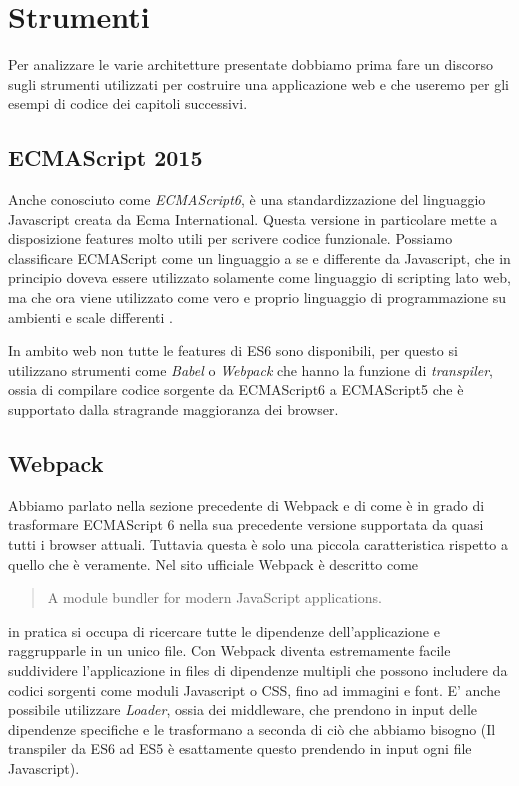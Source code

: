 \chapter{Strumenti}
Per analizzare le varie architetture presentate dobbiamo prima fare un discorso sugli strumenti utilizzati per costruire una applicazione web e che useremo per gli esempi di codice dei capitoli successivi.

\section{ECMAScript 2015}
Anche conosciuto come \textit{ECMAScript6}, è una standardizzazione del linguaggio Javascript creata da Ecma International. Questa versione in particolare mette a disposizione features molto utili per scrivere codice funzionale. Possiamo classificare ECMAScript come un linguaggio a se e differente da Javascript, che in principio doveva essere utilizzato solamente come linguaggio di scripting lato web, ma che ora viene utilizzato come vero e proprio linguaggio di programmazione su ambienti e scale differenti \cite{ECMAScriptDocumentation}.

In ambito web non tutte le features di ES6 sono disponibili, per questo si utilizzano strumenti come \textit{Babel} o \textit{Webpack} che hanno la funzione di \textit{transpiler}, ossia di compilare codice sorgente da ECMAScript6 a ECMAScript5 che è supportato dalla stragrande maggioranza dei browser.

\section{Webpack}
Abbiamo parlato nella sezione precedente di Webpack e di come è in grado di trasformare ECMAScript 6 nella sua precedente versione supportata da quasi tutti i browser attuali. Tuttavia questa è solo una piccola caratteristica rispetto a quello che è veramente.
Nel sito ufficiale Webpack è descritto come \blockquote{A module bundler for modern JavaScript applications.} in pratica si occupa di ricercare tutte le dipendenze dell'applicazione e raggrupparle in un unico file.
Con Webpack diventa estremamente facile suddividere l'applicazione in files di dipendenze multipli che possono includere da codici sorgenti come moduli Javascript o CSS, fino ad immagini e font.
E' anche possibile utilizzare \textit{Loader}, ossia dei middleware, che prendono in input delle dipendenze specifiche e le trasformano a seconda di ciò che abbiamo bisogno (Il transpiler da ES6 ad ES5 è esattamente questo prendendo in input ogni file Javascript).

